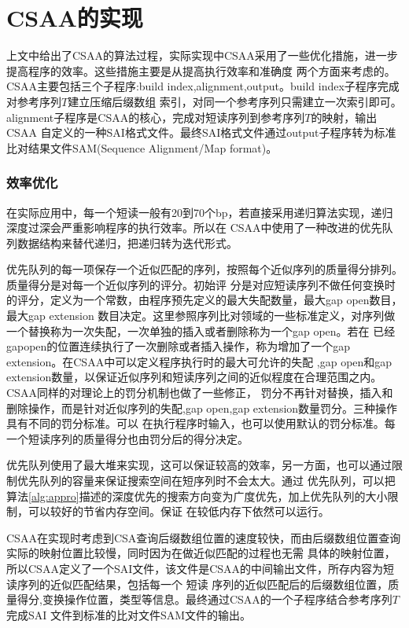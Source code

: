 \chapter{CSAA的实现}

上文中给出了CSAA的算法过程，实际实现中CSAA采用了一些优化措施，进一步提高程序的效率。这些措施主要是从提高执行效率和准确度
两个方面来考虑的。CSAA主要包括三个子程序:build index,alignment,output。build index子程序完成对参考序列$T$建立压缩后缀数组
索引，对同一个参考序列只需建立一次索引即可。alignment子程序是CSAA的核心，完成对短读序列到参考序列$T$的映射，输出CSAA
自定义的一种SAI格式文件。最终SAI格式文件通过output子程序转为标准比对结果文件SAM(Sequence Alignment/Map format)。

\subsection{效率优化}
在实际应用中，每一个短读一般有20到70个bp，若直接采用递归算法实现，递归深度过深会严重影响程序的执行效率。所以在
CSAA中使用了一种改进的优先队列数据结构来替代递归，把递归转为迭代形式。

优先队列的每一项保存一个近似匹配的序列，按照每个近似序列的质量得分排列。质量得分是对每一个近似序列的评分。初始评
分是对应短读序列不做任何变换时的评分，定义为一个常数，由程序预先定义的最大失配数量，最大gap open数目，最大gap extension
数目决定。这里参照序列比对领域的一些标准定义，对序列做一个替换称为一次失配，一次单独的插入或者删除称为一个gap open。若在
已经gapopen的位置连续执行了一次删除或者插入操作，称为增加了一个gap extension。在CSAA中可以定义程序执行时的最大可允许的失配
,gap open和gap extension数量，以保证近似序列和短读序列之间的近似程度在合理范围之内。CSAA同样的对理论上的罚分机制也做了一些修正，
罚分不再针对替换，插入和删除操作，而是针对近似序列的失配,gap open,gap extension数量罚分。三种操作具有不同的罚分标准。可以
在执行程序时输入，也可以使用默认的罚分标准。每一个短读序列的质量得分也由罚分后的得分决定。

优先队列使用了最大堆来实现，这可以保证较高的效率，另一方面，也可以通过限制优先队列的容量来保证搜索空间在短序列时不会太大。通过
优先队列，可以把算法\ref{alg:appro}描述的深度优先的搜索方向变为广度优先，加上优先队列的大小限制，可以较好的节省内存空间。保证
在较低内存下依然可以运行。

CSAA在实现时考虑到CSA查询后缀数组位置的速度较快，而由后缀数组位置查询实际的映射位置比较慢，同时因为在做近似匹配的过程也无需
具体的映射位置，所以CSAA定义了一个SAI文件，该文件是CSAA的中间输出文件，所存内容为短读序列的近似匹配结果，包括每一个
短读 序列的近似匹配后的后缀数组位置，质量得分,变换操作位置，类型等信息。最终通过CSAA的一个子程序结合参考序列$T$完成SAI
文件到标准的比对文件SAM文件的输出。

